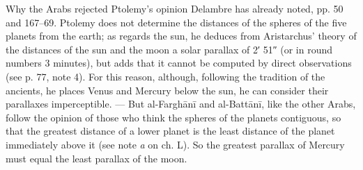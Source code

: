 \documentclass[11pt]{article}
\begin{document}
\par Why the Arabs rejected Ptolemy's opinion Delambre has already noted, pp. 50 and 167–69. Ptolemy does not determine the distances of the spheres of the five planets from the earth; as regards the sun, he deduces from Aristarchus' theory of the distances of the sun and the moon a solar parallax of 2′ 51″ (or in round numbers 3 minutes), but adds that it cannot be computed by direct observations (see p. 77, note 4). For this reason, although, following the tradition of the ancients, he places Venus and Mercury below the sun, he can consider their parallaxes imperceptible. — But al-Farghānī and al-Battānī, like the other Arabs, follow the opinion of those who think the spheres of the planets contiguous, so that the greatest distance of a lower planet is the least distance of the planet immediately above it (see note \emph{a} on ch. L). So the greatest parallax of Mercury must equal the least parallax of the moon.\par
\end{document}
